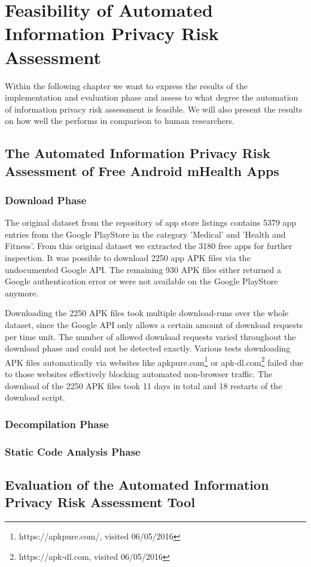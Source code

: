 \section{Feasibility of Automated Information Privacy Risk Assessment}

Within the following chapter we want to express the results of the implementation and evaluation phase and assess to what degree the automation of information privacy risk assessment is feasible.
We will also present the results on how well the \aiprat performs in comparison to human researchers.

\subsection{The Automated Information Privacy Risk Assessment of Free Android mHealth Apps}

\subsubsection{Download Phase}

The original dataset from the \cite{Xu2015} repository of app store listings contains 5379 app entries from the Google PlayStore in the category 'Medical' and 'Health and Fitness'.
From this original dataset we extracted the 3180 free apps for further inspection.
It was possible to download 2250 app APK files via the undocumented Google API.
The remaining 930 APK files either returned a Google authentication error or were not available on the Google PlayStore anymore.

Downloading the 2250 APK files took multiple download-runs over the whole dataset, since the Google API only allows a certain amount of download requests per time unit.
The number of allowed download requests varied throughout the download phase and could not be detected exactly.
Various tests downloading APK files automatically via websites like apkpure.com\footnote{https://apkpure.com/, visited 06/05/2016} or apk-dl.com\footnote{https://apk-dl.com, visited 06/05/2016} failed due to those websites effectively blocking automated non-browser traffic.
The download of the 2250 APK files took 11 days in total and 18 restarts of the download script.

\subsubsection{Decompilation Phase}

\subsubsection{Static Code Analysis Phase}


\subsection{Evaluation of the Automated Information Privacy Risk Assessment Tool}